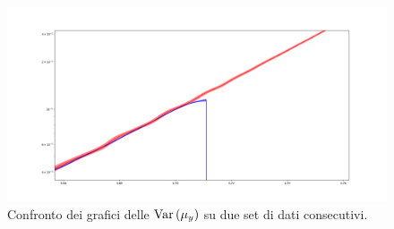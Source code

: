 \documentclass{article}[a4paper, oneside, 11pt]
\begin{document}
\begin{figure}[!htbp]
	\centering 
 		\includegraphics[scale=0.32]{./comparison.png}
 	\caption{Confronto dei grafici delle $\text{Var}\left(\mu_y\right)$ su due set di
	dati consecutivi. \label{fig: comparison}}
\end{figure}

\end{document}
